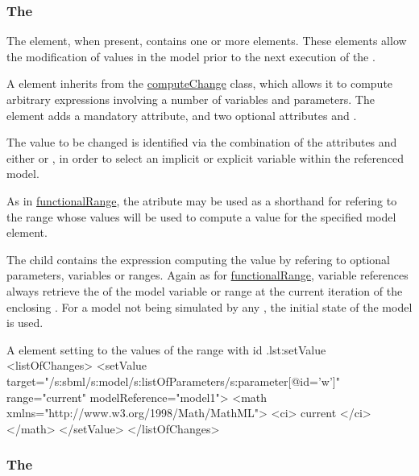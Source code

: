 \subsubsection{The }
\label{sec:changes}
\label{class:setValue}

The  element, when present, contains one or more  elements. These elements allow the modification of values in the model prior to the next execution of the .

A  element inherits from the \hyperref[class:computeChange]{computeChange} class, which allows it to compute arbitrary expressions involving a number of variables and parameters. The element  adds a mandatory  attribute, and two optional attributes  and .

The value to be changed is identified via the combination of the attributes  and either  or , in order to select an implicit or explicit variable within the referenced model.

As in \hyperref[class:functionalRange]{functionalRange}, the atribute  may be used as a shorthand for refering to the range whose values will be used to compute a value for the specified model element.

The child  contains the expression computing the value by refering to optional parameters, variables or ranges.
Again as for \hyperref[class:functionalRange]{functionalRange}, variable references always retrieve the  of the model variable or range at the current iteration of the enclosing . For a model not being simulated by any , the initial state of the model is used.

\begin{myXmlLst}{A  element setting  to the values of the range with id .}{lst:setValue}
  <listOfChanges>
    <setValue target="/s:sbml/s:model/s:listOfParameters/s:parameter[@id='w']"
              range="current" modelReference="model1">
      <math xmlns="http://www.w3.org/1998/Math/MathML">
        <ci> current </ci>
      </math>
    </setValue>
  </listOfChanges>
\end{myXmlLst}


\subsubsection{The }
\label{class:subTask}

